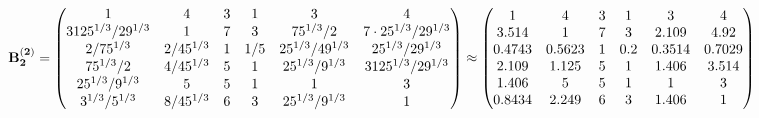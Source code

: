 \documentclass[10pt,a4paper]{article}
\begin{document}
	\[
		\bold{B_2^{(2)}} = 
		\begin{pmatrix}
			{1}{} & {{4}}{} & {{3}}{} & {1}{} & {{3}}{} & {{4}}{} \\
			{{3125^ {1 / 3}}} / {{2}{9^ {1 / 3}}} & {1}{} & {{7}}{} & {{3}}{} & {{75^ {1 / 3}}} / {{2}} & {{7} \cdot {25^ {1 / 3}}} / {{2}{9^ {1 / 3}}} \\
			{{2}} / {{75^ {1 / 3}}} & {{2}} / {{45^ {1 / 3}}} & {1}{} & {1} / {{5}} & {{25^ {1 / 3}}} / {{4}{9^ {1 / 3}}} & {{25^ {1 / 3}}} / {{2}{9^ {1 / 3}}} \\
			{{75^ {1 / 3}}} / {{2}} & {{4}} / {{45^ {1 / 3}}} & {{5}}{} & {1}{} & {{25^ {1 / 3}}} / {{9^ {1 / 3}}} & {{3125^ {1 / 3}}} / {{2}{9^ {1 / 3}}} \\
			{{25^ {1 / 3}}} / {{9^ {1 / 3}}} & {{5}}{} & {{5}}{} & {1}{} & {1}{} & {{3}}{} \\
			{{3^ {1 / 3}}} / {{5^ {1 / 3}}} & {{8}} / {{45^ {1 / 3}}} & {{6}}{} & {{3}}{} & {{25^ {1 / 3}}} / {{9^ {1 / 3}}} & {1}{} \\
		\end{pmatrix}
		\approx
		\begin{pmatrix}
			1        & 4        & 3        & 1        & 3        & 4        \\
			3.514    & 1        & 7        & 3        & 2.109    & 4.92     \\
			0.4743   & 0.5623   & 1        & 0.2      & 0.3514   & 0.7029   \\
			2.109    & 1.125    & 5        & 1        & 1.406    & 3.514    \\
			1.406    & 5        & 5        & 1        & 1        & 3        \\
			0.8434   & 2.249    & 6        & 3        & 1.406    & 1        \\
		\end{pmatrix}
	\]
\end{document}
